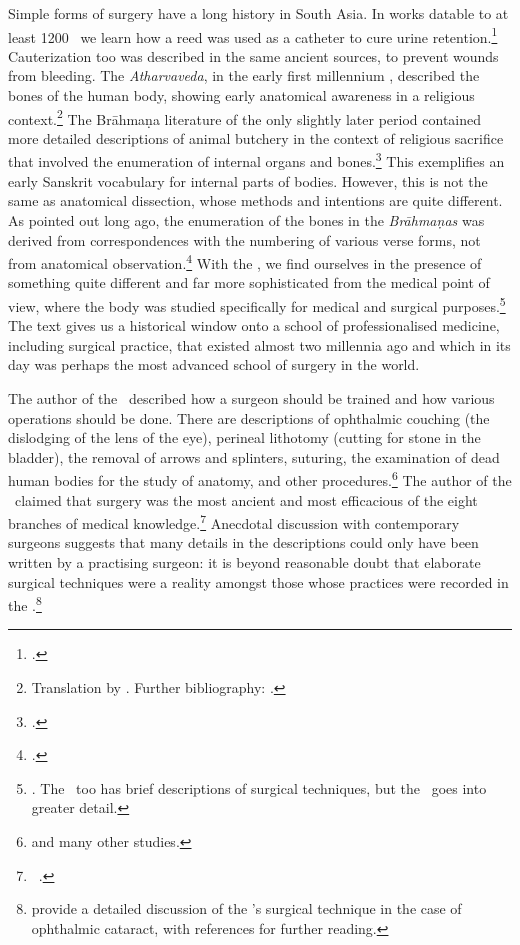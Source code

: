 Simple forms of surgery have a long history in South Asia. In works datable to at
least 1200 \BC\ we learn how a reed was used as a catheter to cure urine
retention.\footcite[70--71]{zysk-1985} Cauterization too was described in the same
ancient sources, to prevent wounds from bleeding. The \emph{Atharvaveda}, in the
early first millennium \BC, described the bones of the human body, showing early
anatomical awareness in a religious context.\footnote{Translation by \citet[\S43,
    \S100]{hoer-1907}. Further bibliography: \cite[IIB, 819]{meul-hist}.} The Brāhmaṇa
    literature of the only slightly later period contained more detailed descriptions
    of animal butchery in the context of religious sacrifice that involved the
    enumeration of internal organs and bones.\footcite{mala-1996,saha-2015}   This
    exemplifies an early Sanskrit vocabulary for internal parts of bodies.  However,
    this is not the same as anatomical dissection, whose methods and intentions are
    quite different. As \citeauthor{keit-1908} pointed out long ago, the enumeration
    of the bones in the \emph{Brāhmaṇas} was derived from correspondences with the
    numbering of various verse forms, not from anatomical
    observation.\footcite{keit-1908}  With the \SS, we find ourselves in the presence
    of something quite different and far more sophisticated from the medical point of
    view, where the body was studied specifically for medical and surgical
    purposes.\footnote{\cite{zysk-1986}. The \CS\ too has brief descriptions of
        surgical techniques, but the \SS\ goes into greater detail.} The text gives us a
        historical window onto a school of professionalised medicine, including surgical
        practice, that existed almost two millennia ago and which in its day was perhaps
        the most advanced school of surgery in the world.

The author of the \SS\ described how a surgeon should be trained and how various
operations should be done.  There are descriptions of ophthalmic couching (the
dislodging of the lens of the eye), perineal lithotomy (cutting for stone in the
bladder), the removal of arrows and splinters, suturing, the examination of dead
human bodies for the study of anatomy, and other
procedures.\footnote{\cites{mukh-1913,desh-2000,nara-2011,wuja-2003,wils-1823,vali-2007}
 and
many other studies.} The author of the \SS\ claimed that surgery was the most
ancient and most efficacious of the eight branches of medical
knowledge.\footnote{\SS\ .} Anecdotal discussion with
contemporary surgeons suggests that many details in the descriptions could only
have been written by a practising surgeon: it is beyond reasonable doubt that elaborate
surgical techniques were a reality amongst those whose practices were recorded in the 
\SS.\footnote{\cite{leff-2020} 
provide a detailed discussion of the \SS's surgical technique in the case of ophthalmic 
cataract, with references for further reading.}

